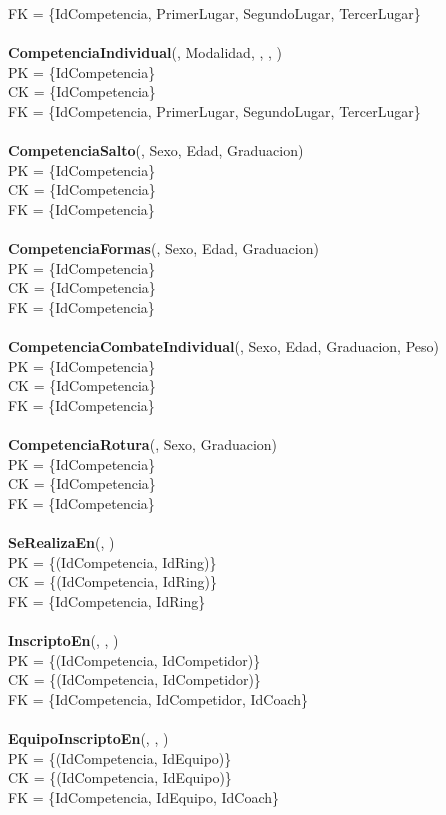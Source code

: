 FK = \{IdCompetencia, PrimerLugar, SegundoLugar, TercerLugar\}\\
\\
\textbf{CompetenciaIndividual}(, Modalidad, , , )\\
PK = \{IdCompetencia\}\\
CK = \{IdCompetencia\}\\
FK = \{IdCompetencia, PrimerLugar, SegundoLugar, TercerLugar\}\\
\\
\textbf{CompetenciaSalto}(, Sexo, Edad, Graduacion)\\
PK = \{IdCompetencia\}\\
CK = \{IdCompetencia\}\\
FK = \{IdCompetencia\}\\
\\
\textbf{CompetenciaFormas}(, Sexo, Edad, Graduacion)\\
PK = \{IdCompetencia\}\\
CK = \{IdCompetencia\}\\
FK = \{IdCompetencia\}\\
\\
\textbf{CompetenciaCombateIndividual}(, Sexo, Edad, Graduacion, Peso)\\
PK = \{IdCompetencia\}\\
CK = \{IdCompetencia\}\\
FK = \{IdCompetencia\}\\
\\
\textbf{CompetenciaRotura}(, Sexo, Graduacion)\\
PK = \{IdCompetencia\}\\
CK = \{IdCompetencia\}\\
FK = \{IdCompetencia\}\\
\\
\textbf{SeRealizaEn}(, )\\
PK = \{(IdCompetencia, IdRing)\}\\
CK = \{(IdCompetencia, IdRing)\}\\
FK = \{IdCompetencia, IdRing\}\\
\\
\textbf{InscriptoEn}(, , )\\
PK = \{(IdCompetencia, IdCompetidor)\}\\
CK = \{(IdCompetencia, IdCompetidor)\}\\
FK = \{IdCompetencia, IdCompetidor, IdCoach\}\\
\\
\textbf{EquipoInscriptoEn}(, , )\\
PK = \{(IdCompetencia, IdEquipo)\}\\
CK = \{(IdCompetencia, IdEquipo)\}\\
FK = \{IdCompetencia, IdEquipo, IdCoach\}\\
\\
